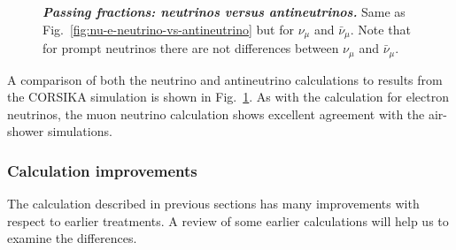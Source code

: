 \begin{figure}
	\centering
	\caption{\textbf{\textit{Passing fractions: neutrinos versus antineutrinos.}} Same as Fig.~\ref{fig:nu-e-neutrino-vs-antineutrino} but for $\nu_\mu$ and $\bar\nu_\mu$. Note that for prompt neutrinos there are not differences between $\nu_\mu$ and $\bar\nu_\mu$.}
	\label{fig:nu-mu-neutrino-vs-antineutrino}
\end{figure}

A comparison of both the neutrino and antineutrino calculations to results from the CORSIKA simulation is shown in Fig.~\ref{fig:nu-mu-neutrino-vs-antineutrino}.
As with the calculation for electron neutrinos, the muon neutrino calculation shows excellent agreement with the air-shower simulations.

\subsubsection{Calculation improvements}

The calculation described in previous sections has many improvements with respect to earlier treatments.
A review of some earlier calculations will help us to examine the differences.

